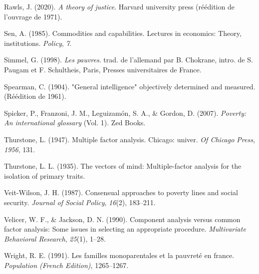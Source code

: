 \documentclass[12pt,a4paper]{reedthesis}
\newenvironment{CSLReferences}%
  {}%
  {\par}
\begin{document}
\begin{CSLReferences}{1}{0}
\leavevmode\hypertarget{ref-rawls2020theory}{}%
Rawls, J. (2020). \emph{A theory of justice}. Harvard university press (réédition de l'ouvrage de 1971).

\leavevmode\hypertarget{ref-sen1985commodities}{}%
Sen, A. (1985). Commodities and capabilities. Lectures in economics: Theory, institutions. \emph{Policy}, \emph{7}.

\leavevmode\hypertarget{ref-simmel2011pauvres}{}%
Simmel, G. (1998). \emph{Les pauvres}. trad. de l'allemand par B. Chokrane, intro. de S. Paugam et F. Schultheis, Paris, Presses universitaires de France.

\leavevmode\hypertarget{ref-spearman1961general}{}%
Spearman, C. (1904). "General intelligence" objectively determined and measured. (Réédition de 1961).

\leavevmode\hypertarget{ref-spicker2007poverty}{}%
Spicker, P., Franzoni, J. M., Leguizamón, S. A., \& Gordon, D. (2007). \emph{Poverty: An international glossary} (Vol. 1). Zed Books.

\leavevmode\hypertarget{ref-thurstone1947multiple}{}%
Thurstone, L. (1947). Multiple factor analysis. Chicago: univer. \emph{Of Chicago Press}, \emph{1956}, 131.

\leavevmode\hypertarget{ref-thurstone1935vectors}{}%
Thurstone, L. L. (1935). The vectors of mind: Multiple-factor analysis for the isolation of primary traits.

\leavevmode\hypertarget{ref-veit1987consensual}{}%
Veit-Wilson, J. H. (1987). Consensual approaches to poverty lines and social security. \emph{Journal of Social Policy}, \emph{16}(2), 183--211.

\leavevmode\hypertarget{ref-velicer1990component}{}%
Velicer, W. F., \& Jackson, D. N. (1990). Component analysis versus common factor analysis: Some issues in selecting an appropriate procedure. \emph{Multivariate Behavioral Research}, \emph{25}(1), 1--28.

\leavevmode\hypertarget{ref-wright1991familles}{}%
Wright, R. E. (1991). Les familles monoparentales et la pauvret{é} en france. \emph{Population (French Edition)}, 1265--1267.

\end{CSLReferences}

\newpage
\thispagestyle{empty}
\selectfont
\end{document}
